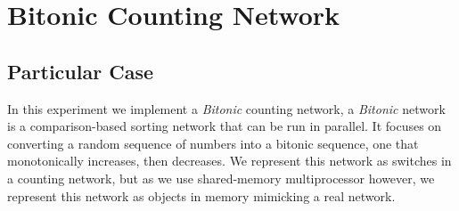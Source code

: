 


\section{\textbf{Bitonic Counting Network}}



\subsection{Particular Case}
\par
In this experiment we implement a \textit{Bitonic} counting network, a \textit{Bitonic} network is a comparison-based sorting network that can be run in parallel. It focuses on converting a random sequence of numbers into a bitonic sequence, one that monotonically increases, then decreases.
We represent this network as switches in a counting network, but as we use shared-memory multiprocessor however, we represent this network as objects in memory mimicking a real network.
\par



